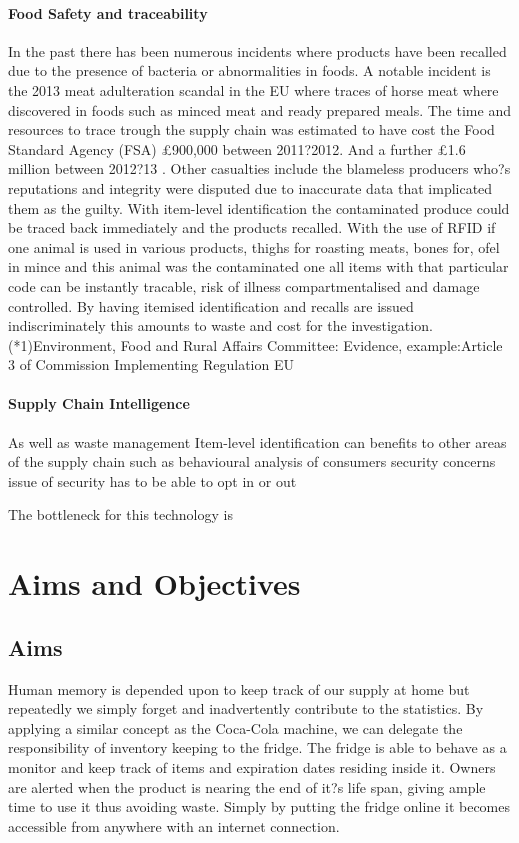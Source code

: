 \documentclass[a4paper, 11pt]{article}
\begin{document}
\paragraph{Food Safety and traceability}
In the past there has been numerous incidents where products have been recalled due to the presence of bacteria or abnormalities in foods. A notable incident is the 2013 meat adulteration scandal in the EU where traces of horse meat where discovered in foods such as minced meat and ready prepared meals. The time and resources to trace trough the supply chain was estimated to have cost the Food Standard Agency (FSA) \pounds900,000 between 2011?2012. And a further \pounds1.6 million between 2012?13 \cite{3}. Other casualties include the blameless producers who?s reputations and integrity were disputed due to inaccurate data that implicated them as the guilty. With item-level identification the contaminated produce could be traced back immediately and the products recalled. With the use of RFID if one animal is used in various products, thighs for roasting meats, bones for, ofel in mince and this animal was the contaminated one all items with that particular code can be instantly tracable, risk of illness compartmentalised and damage controlled. 
By having itemised identification and recalls are issued indiscriminately this amounts to waste and cost for the investigation.
(*1)Environment, Food and Rural Affairs Committee: Evidence,
example:Article 3 of Commission Implementing Regulation EU

\paragraph{Supply Chain Intelligence} As well as waste management Item-level identification can benefits to other areas of the supply chain such as behavioural analysis of consumers
security concerns 
issue of security has to be able to opt in or out

The bottleneck for this technology is 

\clearpage
\section{Aims and Objectives}
\subsection{Aims}
Human memory is depended upon to keep track of our supply at home but repeatedly we simply forget and inadvertently contribute to the statistics. By applying a similar concept as the Coca-Cola machine, we can delegate the responsibility of inventory keeping to the fridge. The fridge is able to behave as a monitor and keep track of items and expiration dates residing inside it. Owners are alerted when the product is nearing the end of it?s life span, giving ample time to use it thus avoiding waste. Simply by putting the fridge online it becomes accessible from anywhere with an internet connection.
\end{document}
